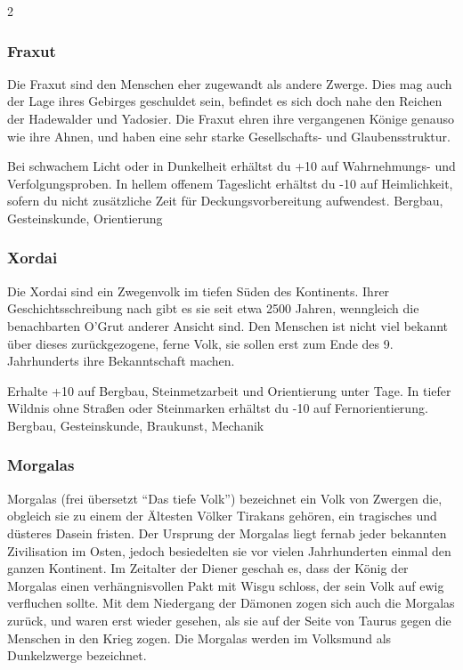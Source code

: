 {\begin{multicols*}{2}
        \subsubsection*{Fraxut}
        Die Fraxut sind den Menschen eher zugewandt als andere Zwerge. Dies mag auch der Lage ihres Gebirges geschuldet sein, befindet es sich doch nahe den Reichen der Hadewalder und Yadosier. Die Fraxut ehren ihre vergangenen Könige genauso wie ihre Ahnen, und haben eine sehr starke Gesellschafts- und Glaubensstruktur.

        \abstammungspielwertebox
        {Bei schwachem Licht oder in Dunkelheit erhältst du +10 auf Wahrnehmungs- und Verfolgungsproben.}
        {In hellem offenem Tageslicht erhältst du -10 auf Heimlichkeit, sofern du nicht zusätzliche Zeit für Deckungsvorbereitung aufwendest.}
        {Bergbau, Gesteinskunde, Orientierung}

        \subsubsection*{Xordai}
        Die Xordai sind ein Zwegenvolk im tiefen Süden des Kontinents. Ihrer Geschichtsschreibung nach gibt es sie seit etwa 2500 Jahren, wenngleich die benachbarten O'Grut anderer Ansicht sind. Den Menschen ist nicht viel bekannt über dieses zurückgezogene, ferne Volk, sie sollen erst zum Ende des 9. Jahrhunderts ihre Bekanntschaft machen.

        \abstammungspielwertebox
        {Erhalte +10 auf Bergbau, Steinmetzarbeit und Orientierung unter Tage.}
        {In tiefer Wildnis ohne Straßen oder Steinmarken erhältst du -10 auf Fernorientierung.}
        {Bergbau, Gesteinskunde, Braukunst, Mechanik}

        \subsubsection*{Morgalas}
        Morgalas (frei übersetzt ``Das tiefe Volk'') bezeichnet ein Volk von Zwergen die, obgleich sie zu einem der Ältesten Völker Tirakans gehören, ein tragisches und düsteres Dasein fristen. Der Ursprung der Morgalas liegt fernab jeder bekannten Zivilisation im Osten, jedoch besiedelten sie vor vielen Jahrhunderten einmal den ganzen Kontinent. Im Zeitalter der Diener geschah es, dass der König der Morgalas einen verhängnisvollen Pakt mit Wisgu schloss, der sein Volk auf ewig verfluchen sollte. Mit dem Niedergang der Dämonen zogen sich auch die Morgalas zurück, und waren erst wieder gesehen, als sie auf der Seite von Taurus gegen die Menschen in den Krieg zogen. Die Morgalas werden im Volksmund als Dunkelzwerge bezeichnet.


\end{multicols*}}
